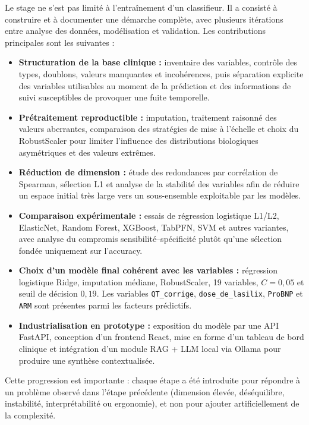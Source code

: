 \documentclass[12pt,a4paper]{report}
\begin{document}
Le stage ne s'est pas limité à l'entraînement d'un classifieur. Il a consisté à construire
et à documenter une démarche complète, avec plusieurs itérations entre analyse des données,
modélisation et validation. Les contributions principales sont les suivantes :
\begin{itemize}[leftmargin=1.5em]
 \item \textbf{Structuration de la base clinique :} inventaire des variables, contrôle des
 types, doublons, valeurs manquantes et incohérences, puis séparation explicite des
 variables utilisables au moment de la prédiction et des informations de suivi susceptibles
 de provoquer une fuite temporelle.
 \item \textbf{Prétraitement reproductible :} imputation, traitement raisonné des valeurs
 aberrantes, comparaison des stratégies de mise à l'échelle et choix du RobustScaler pour
 limiter l'influence des distributions biologiques asymétriques et des valeurs extrêmes.
 \item \textbf{Réduction de dimension :} étude des redondances par corrélation de Spearman,
 sélection L1 et analyse de la stabilité des variables afin de réduire un espace initial très
 large vers un sous-ensemble exploitable par les modèles.
 \item \textbf{Comparaison expérimentale :} essais de régression logistique L1/L2,
 ElasticNet, Random Forest, XGBoost, TabPFN, SVM et autres variantes, avec analyse du
 compromis sensibilité--spécificité plutôt qu'une sélection fondée uniquement sur l'accuracy.
 \item \textbf{Choix d'un modèle final cohérent avec les variables :} régression logistique Ridge, imputation médiane, RobustScaler, 19 variables,
  $C=0{,}05$ et seuil de décision $0{,}19$. Les variables \texttt{QT\_corrige}, \texttt{dose\_de\_lasilix}, \texttt{ProBNP} et \texttt{ARM} sont présentes parmi les facteurs prédictifs.
 \item \textbf{Industrialisation en prototype :} exposition du modèle par une API FastAPI,
 conception d'un frontend React, mise en forme d'un tableau de bord clinique et intégration
 d'un module RAG + LLM local via Ollama pour produire une synthèse contextualisée.
\end{itemize}

Cette progression est importante : chaque étape a été introduite pour répondre à un
problème observé dans l'étape précédente (dimension élevée, déséquilibre, instabilité,
interprétabilité ou ergonomie), et non pour ajouter artificiellement de la complexité.
\end{document}
